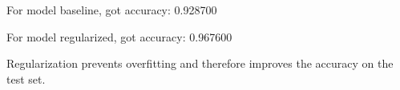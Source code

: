 \begin{answer}
    For model baseline, got accuracy: 0.928700

    For model regularized, got accuracy: 0.967600

    Regularization prevents overfitting and therefore improves the accuracy on the test set.
\end{answer}
   
  
